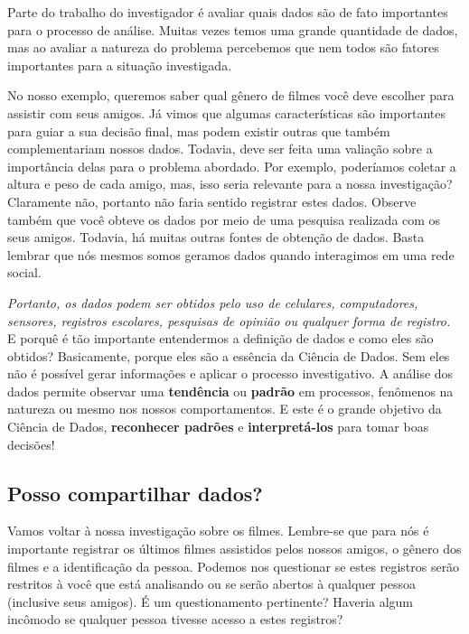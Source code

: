 \documentclass[
  portuguese,
  oneside]{book}
\begin{document}
Parte do trabalho do investigador é avaliar quais dados são de fato importantes para o processo de análise. Muitas vezes temos uma grande quantidade de dados, mas ao avaliar a natureza do problema percebemos que nem todos são fatores importantes para a situação investigada.

No nosso exemplo, queremos saber qual gênero de filmes você deve escolher para assistir com seus amigos. Já vimos que algumas características são importantes para guiar a sua decisão final, mas podem existir outras que também complementariam nossos dados. Todavia, deve ser feita uma valiação sobre a importância delas para o problema abordado. Por exemplo, poderíamos coletar a altura e peso de cada amigo, mas, isso seria relevante para a nossa investigação? Claramente não, portanto não faria sentido registrar estes dados. Observe também que você obteve os dados por meio de uma pesquisa realizada com os seus amigos. Todavia, há muitas outras fontes de obtenção de dados. Basta lembrar que nós mesmos somos geramos dados quando interagimos em uma rede social.

\emph{Portanto, os dados podem ser obtidos pelo uso de celulares, computadores, sensores, registros escolares, pesquisas de opinião ou qualquer forma de registro.}
E porquê é tão importante entendermos a definição de dados e como eles são obtidos? Basicamente, porque eles são a essência da Ciência de Dados. Sem eles não é possível gerar informações e aplicar o processo investigativo. A análise dos dados permite observar uma \textbf{tendência} ou \textbf{padrão} em processos, fenômenos na natureza ou mesmo nos nossos comportamentos. E este é o grande objetivo da Ciência de Dados, \textbf{reconhecer padrões} e \textbf{interpretá-los} para tomar boas decisões!

\hypertarget{posso-compartilhar-dados}{%
\subsection{Posso compartilhar dados?}\label{posso-compartilhar-dados}}

Vamos voltar à nossa investigação sobre os filmes. Lembre-se que para nós é importante registrar os últimos filmes assistidos pelos nossos amigos, o gênero dos filmes e a identificação da pessoa. Podemos nos questionar se estes registros serão restritos à você que está analisando ou se serão abertos à qualquer pessoa (inclusive seus amigos). É um questionamento pertinente? Haveria algum incômodo se qualquer pessoa tivesse acesso a estes registros?
\end{document}
